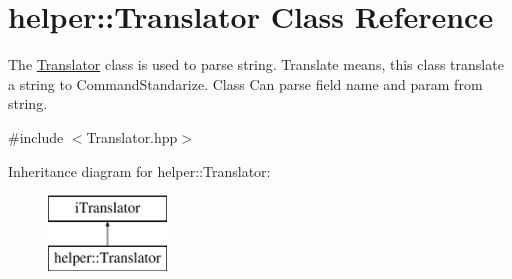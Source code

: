 \hypertarget{classhelper_1_1_translator}{}\section{helper\+::Translator Class Reference}
\label{classhelper_1_1_translator}


The \mbox{\hyperlink{classhelper_1_1_translator}{Translator}} class is used to parse string. Translate means, this class translate a string to Command\+Standarize. Class Can parse field name and param from string.  




{\ttfamily \#include $<$Translator.\+hpp$>$}

Inheritance diagram for helper\+::Translator\+:\begin{figure}[H]
\begin{center}
\leavevmode
\includegraphics[height=2.000000cm]{classhelper_1_1_translator}
\end{center}
\end{figure}
